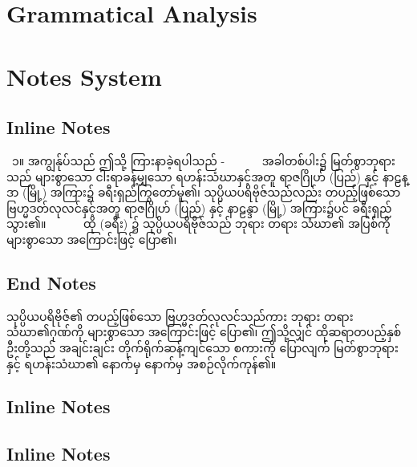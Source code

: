 

\section{Grammatical Analysis}
\kitabasic{}{}{}

\kitafull{}{}{}{}

\kitafull*{}{}{}{}

\taddhita{}{}{}

\samasa{}{}{}

\namapada{}{}{}

\akhyatapada{}{}{}{}


\section{Notes System}
\subsection{Inline Notes}
 ၁။ အကျွန်ုပ်သည် ဤသို့ ကြားနာခဲ့ရပါသည် -
       အခါတစ်ပါး၌ မြတ်စွာဘုရားသည် များစွာသော ငါးရာခန့်မျှသော ရဟန်းသံဃာနှင့်အတူ ရာဇဂြိုဟ် (ပြည်) နှင့် နာဠန္ဒာ (မြို့) အကြား၌ ခရီးရှည်ကြွတော်မူ၏၊ သုပ္ပိယပရိဗိုဇ်သည်လည်း တပည့်ဖြစ်သော ဗြဟ္မဒတ်လုလင်နှင့်အတူ ရာဇဂြိုဟ် (ပြည်) နှင့် နာဠန္ဒာ (မြို့) အကြား၌ပင် ခရီးရှည်သွား၏။
       ထို (ခရီး) ၌ သုပ္ပိယပရိဗိုဇ်သည် ဘုရား တရား သံဃာ၏ အပြစ်ကို များစွာသော အကြောင်းဖြင့် ပြော၏၊ 

\subsection{End Notes}
သုပ္ပိယပရိဗိုဇ်၏ တပည့်ဖြစ်သော ဗြဟ္မဒတ်လုလင်သည်ကား ဘုရား တရား သံဃာ၏ဂုဏ်ကို များစွာသော အကြောင်းဖြင့် ပြော၏၊ ဤသို့လျှင် ထိုဆရာတပည့်နှစ်ဦးတို့သည် အချင်းချင်း တိုက်ရိုက်ဆန့်ကျင်သော စကားကို ပြောလျက် မြတ်စွာဘုရားနှင့် ရဟန်းသံဃာ၏ နောက်မှ နောက်မှ အစဉ်လိုက်ကုန်၏။

\subsection{Inline Notes}


\subsection{Inline Notes}


\commentarytable